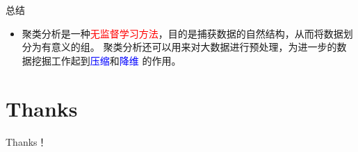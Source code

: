 \documentclass[cjk]{beamer}
\begin{document}
\begin{CJK*}{GBK}{kai}
\begin{frame}{总结}
    \begin{itemize}
      \item 聚类分析是一种\textcolor{red}{无监督学习方法}，目的是捕获数据的自然结构，从而将数据划分为有意义的组。
        聚类分析还可以用来对大数据进行预处理，为进一步的数据挖掘工作起到\textcolor{blue}{压缩}和\textcolor{blue}{降维}
        的作用。
    \end{itemize}
\end{frame}

\section*{Thanks}
\begin{frame}

\begin{center}
\end{center}
\vspace{1cm} {\centerline{\Huge Thanks！}}
\end{frame}



\end{CJK*}
\end{document}
